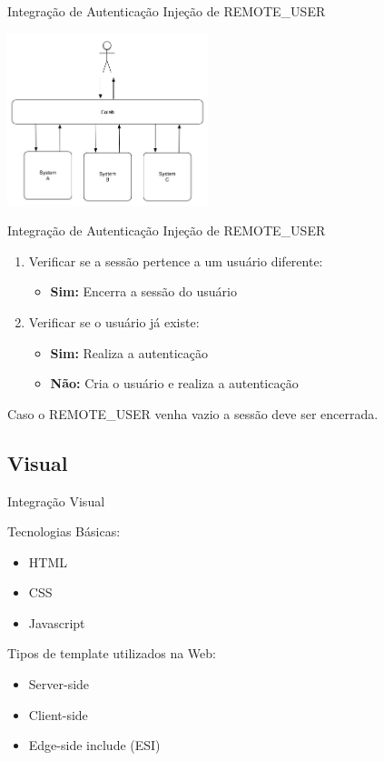 \documentclass{beamer}
\begin{document}
\begin{frame}{Integração de Autenticação}
  Injeção de REMOTE\_USER
  \begin{center}
    \includegraphics[height=5cm]{colab-basics}
  \end{center}
\end{frame}

\begin{frame}{Integração de Autenticação}
  Injeção de REMOTE\_USER
  \begin{enumerate}
    \item{Verificar se a sessão pertence a um usuário diferente:}
    \begin{itemize}
        \item{\textbf{Sim:} Encerra a sessão do usuário}
    \end{itemize}
    
    \item{Verificar se o usuário já existe:}
    \begin{itemize}
        \item{\textbf{Sim:} Realiza a autenticação}
        \item{\textbf{Não:} Cria o usuário e realiza a autenticação}
    \end{itemize}
  \end{enumerate}
  Caso o REMOTE\_USER venha vazio a sessão deve ser encerrada.
\end{frame}


\subsection{Visual}

\begin{frame}{Integração Visual}

  Tecnologias Básicas:
  \begin{itemize}
  \item {
    HTML
  }
  \item {
    CSS
  }
  \item {
    Javascript
  }
  \end{itemize}

  \hfill \break

  Tipos de template utilizados na Web:
  \begin{itemize}
  \item {
    Server-side \cite{Garcia-Izquierdo2012}
  }
  \item {
    Client-side \cite{Garcia-Izquierdo2012}
  }
  \item {
    Edge-side include (ESI) \cite{Brodie2004}
  }
  \end{itemize}
\end{frame}
\end{document}
